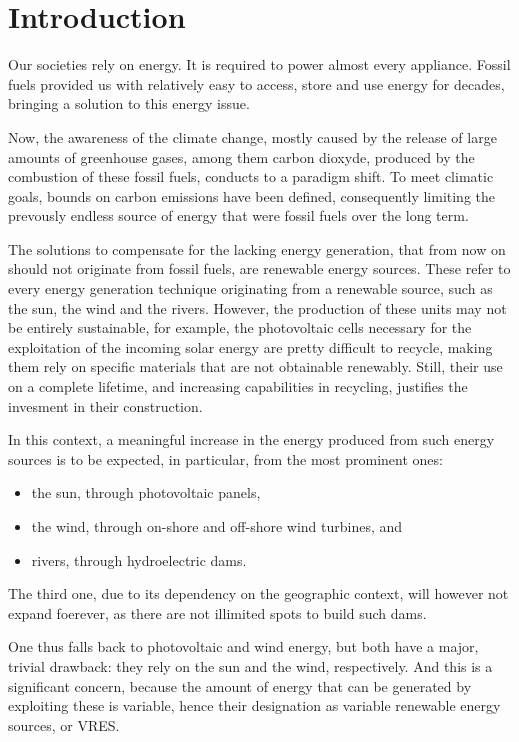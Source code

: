 \section{Introduction}

Our societies rely on energy. It is required to power almost every appliance. Fossil fuels provided us with relatively easy to access, store and use energy for decades, bringing a solution to this energy issue.

Now, the awareness of the climate change, mostly caused by the release of large amounts of greenhouse gases, among them carbon dioxyde, produced by the combustion of these fossil fuels, conducts to a paradigm shift. To meet climatic goals, bounds on carbon emissions have been defined, consequently limiting the prevously endless source of energy that were fossil fuels over the long term.

The solutions to compensate for the lacking energy generation, that from now on should not originate from fossil fuels, are renewable energy sources. These refer to every energy generation technique originating from a renewable source, such as the sun, the wind and the rivers. However, the production of these units may not be entirely sustainable, for example, the photovoltaic cells necessary for the exploitation of the incoming solar energy are pretty difficult to recycle, making them rely on specific materials that are not obtainable renewably. Still, their use on a complete lifetime, and increasing capabilities in recycling, justifies the invesment in their construction.

In this context, a meaningful increase in the energy produced from such energy sources is to be expected, in particular, from the most prominent ones:
\begin{itemize}
    \item the sun, through photovoltaic panels,
    \item the wind, through on-shore and off-shore wind turbines, and
    \item rivers, through hydroelectric dams.
\end{itemize}

The third one, due to its dependency on the geographic context, will however not expand foerever, as there are not illimited spots to build such dams.

One thus falls back to photovoltaic and wind energy, but both have a major, trivial drawback: they rely on the sun and the wind, respectively. And this is a significant concern, because the amount of energy that can be generated by exploiting these is variable, hence their designation as variable renewable energy sources, or VRES.

